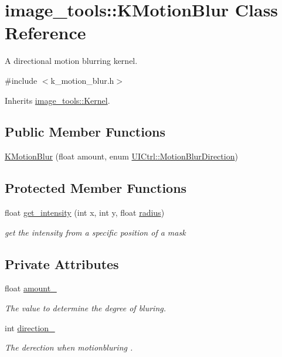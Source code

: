 \hypertarget{classimage__tools_1_1KMotionBlur}{}\section{image\+\_\+tools\+:\+:K\+Motion\+Blur Class Reference}
\label{classimage__tools_1_1KMotionBlur}


A directional motion blurring kernel.  




{\ttfamily \#include $<$k\+\_\+motion\+\_\+blur.\+h$>$}



Inherits \hyperlink{classimage__tools_1_1Kernel}{image\+\_\+tools\+::\+Kernel}.

\subsection*{Public Member Functions}
\begin{DoxyCompactItemize}
\item 
\hyperlink{classimage__tools_1_1KMotionBlur_a75b9862095f6df793defe84f13b339cb}{K\+Motion\+Blur} (float amount, enum \hyperlink{classimage__tools_1_1UICtrl_a56d4f68bf91302769d7bc453d8d57cee}{U\+I\+Ctrl\+::\+Motion\+Blur\+Direction})
\end{DoxyCompactItemize}
\subsection*{Protected Member Functions}
\begin{DoxyCompactItemize}
\item 
float \hyperlink{classimage__tools_1_1KMotionBlur_a1a453c33891327ff252ea69ea0478ba7}{get\+\_\+intensity} (int x, int y, float \hyperlink{classimage__tools_1_1Kernel_ac834d16a242dd4a15f5f5e4a6dacea01}{radius})
\begin{DoxyCompactList}\small\item\em get the intensity from a specific position of a mask \end{DoxyCompactList}\end{DoxyCompactItemize}
\subsection*{Private Attributes}
\begin{DoxyCompactItemize}
\item 
float \hyperlink{classimage__tools_1_1KMotionBlur_ada21399075e72161c3b18bc488eb5eec}{amount\+\_\+}
\begin{DoxyCompactList}\small\item\em The value to determine the degree of bluring. \end{DoxyCompactList}\item 
int \hyperlink{classimage__tools_1_1KMotionBlur_ae0eaeda3f648c6d3a490fbd2ceedc8a0}{direction\+\_\+}
\begin{DoxyCompactList}\small\item\em The derection when motionbluring . \end{DoxyCompactList}\end{DoxyCompactItemize}



